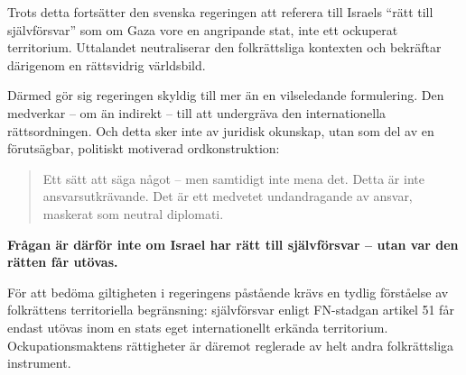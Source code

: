 Trots detta fortsätter den svenska regeringen att referera till Israels \enquote{rätt till självförsvar} som om Gaza vore en angripande stat, inte ett ockuperat territorium. Uttalandet neutraliserar den folkrättsliga kontexten och bekräftar därigenom en rättsvidrig världsbild.

Därmed gör sig regeringen skyldig till mer än en vilseledande formulering. Den medverkar – om än indirekt – till att undergräva den internationella rättsordningen. Och detta sker inte av juridisk okunskap, utan som del av en förutsägbar, politiskt motiverad ordkonstruktion:

\begin{quote}
Ett sätt att säga något – men samtidigt inte mena det.  
Detta är inte ansvarsutkrävande. Det är ett medvetet undandragande av ansvar, maskerat som neutral diplomati.
\end{quote}

\medskip

\textbf{Frågan är därför inte om Israel har rätt till självförsvar – utan var den rätten får utövas.}

För att bedöma giltigheten i regeringens påstående krävs en tydlig förståelse av folkrättens territoriella begränsning: självförsvar enligt FN-stadgan artikel 51 får endast utövas inom en stats eget internationellt erkända territorium. Ockupationsmaktens rättigheter är däremot reglerade av helt andra folkrättsliga instrument.


